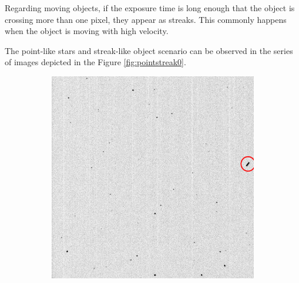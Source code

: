 Regarding moving objects, if the exposure time is long enough that the object is crossing more than one pixel, they appear as streaks. This commonly happens when the object is moving with high velocity. %

The point-like stars and streak-like object scenario can be observed in the series of images depicted in the Figure \ref{fig:pointstreak0}.


\begin{figure}[!h]
    \begin{subfigure}{.3\textwidth}
        \centering
        \includegraphics[width=\textwidth]{images/PointStreak1.png}
        \label{fig:pointstreak1}
    \end{subfigure}
    \hfill
    \begin{subfigure}{.3\textwidth}
        \centering

\end{subfigure}
\end{figure}
